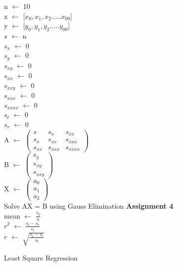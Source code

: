 \documentclass[titlepage, 11pt]{article}
\begin{document}
\begin{center}
\begin{algorithm}[H]\label{alg4}

\SetAlgoLined
{
n $\gets$ 10 \\
x $\gets$ [$x_0,x_1,x_2.....x_{09}$] \\
y $\gets$ [$y_0,y_1,y_2.....y_{09}$] \\
$s$ $\gets$ n \\
$s_x$ $\gets$ 0 \\ 
$s_y$ $\gets$ 0 \\ 
$s_{xy}$ $\gets$ 0 \\ 
$s_{xx}$ $\gets$ 0 \\ 
$s_{xxy}$ $\gets$ 0 \\
$s_{xxx}$ $\gets$ 0 \\
$s_{xxxx}$ $\gets$ 0 \\
$s_t$ $\gets$ 0 \\
$s_r$ $\gets$ 0 \\
A $\gets$
$\begin{pmatrix}
s & s_x & s_{xx}\\
s_x & s_{xx} & s_{xxx} \\
s_{xx} & s_{xxx} & s_{xxxx}
\end{pmatrix}$ \\
B $\gets$
$\begin{pmatrix}
s_y \\
s_{xy} \\
s_{xxy}
\end{pmatrix}$ \\
X $\gets$
$\begin{pmatrix}
a_0 \\
a_1 \\
a_2
\end{pmatrix}$ \\
Solve AX = B using Gauss Elimination \textbf{Assignment 4}\\
mean $\gets$ $\frac{s_y}{n}$ \\
$r^2$ $\gets$ $\frac{s_t-s_r}{s_t}$\\
$r$ $\gets$ $\sqrt{\frac{s_t-s_r}{s_t}}$\\
}
 \caption{Least Square Regression}
\end{algorithm}    
\end{center}
\end{document}
